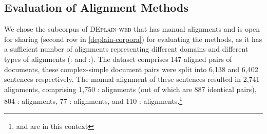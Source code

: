 \documentclass[11pt]{article}
\newcommand{\RS}[1]{\textcolor{violet}{RS: #1}}
\begin{document}
\begin{comment}
\paragraph{BertAlign \cite{10.1093/llc/fqac089}}
is a very new attempt to allow sentence-transformer-based methods to produce n:m alignments. It was tested on Chinese-English comparable corpora and showed promising results.
Our adaptation of this method was only by using a dedicated German sentence transformer model in the algorithm procedure.


\paragraph{MASSAlign}\cite{}
\RS{Lorem ipsum dolor sit amet, consectetur adipiscing elit. Nunc id ligula eget nibh ultrices consectetur sit amet sed enim. Nam ultricies facilisis mi elementum accumsan. Quisque fermentum pulvinar pellentesque. Donec consectetur, velit sed condimentum interdum, eros quam rutrum nunc.}

\paragraph{CATS}
\RS{Lorem ipsum dolor sit amet, consectetur adipiscing elit. Nunc id ligula eget nibh ultrices consectetur sit amet sed enim. Nam ultricies facilisis mi elementum accumsan. Quisque fermentum pulvinar pellentesque. Donec consectetur, velit sed condimentum interdum, eros quam rutrum nunc.}
\end{comment}

\subsection{Evaluation of Alignment Methods}
\label{sec-auto-alignment-eval}




We chose 
the subcorpus of \textsc{DEplain-web} that has manual alignments and is open for sharing (second row in \autoref{deplain-corpora}) for evaluating the methods, as it has a sufficient number of alignments representing different domains and different types of alignments (: and :). The dataset comprises 147 aligned pairs of documents, these complex-simple document pairs were split into 6,138 and 6,402 sentences respectively.
The manual alignment of these sentences resulted in 2,741 alignments, comprising 1,750 : alignments (out of which are 887 identical pairs), 804 : alignments, 77 : alignments, and 110 : alignments.\footnote{ and  are  in this context}
\end{document}
